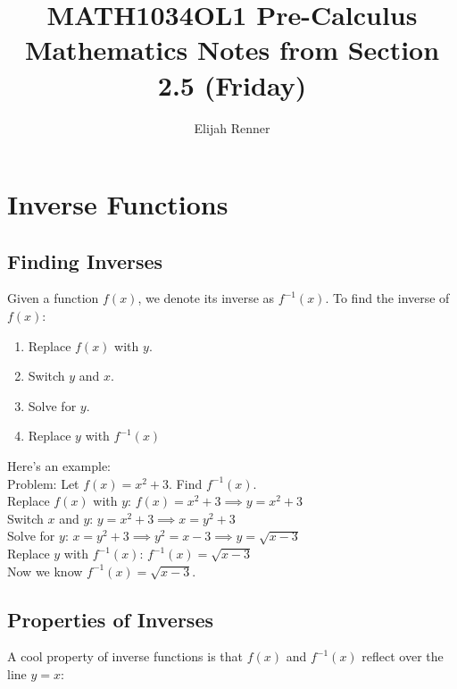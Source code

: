 \documentclass[12pt]{article}
\title{MATH1034OL1 Pre-Calculus Mathematics Notes from Section 2.5 (Friday)}
\author{Elijah Renner}
\begin{document}
\maketitle

\vspace{0.5in}

\tableofcontents

\section{Inverse Functions}

\subsection{Finding Inverses}
Given a function \(f(x)\), we denote its inverse as \(f^{-1}(x).\) To find the inverse of \(f(x)\):\\

\begin{enumerate}
  \item Replace \(f(x)\) with \(y\).
  \item Switch \(y\) and \(x\).
  \item Solve for \(y\).
  \item Replace \(y\) with \(f^{-1}(x)\)
\end{enumerate}

Here's an example:\\

Problem: Let \(f(x)=x^2+3\). Find \(f^{-1}(x)\).\\

Replace \(f(x)\) with \(y\): \(f(x)=x^2+3\implies y=x^2+3\)\\

Switch \(x\) and \(y\): \(y=x^2+3\implies x=y^2+3\)\\

Solve for \(y\): \(x=y^2+3\implies y^2=x-3 \implies y=\sqrt{x-3}\)\\

Replace \(y\) with \(f^{-1}(x)\): \(f^{-1}(x)=\sqrt{x-3}\)\\

Now we know \(f^{-1}(x)=\sqrt{x-3}\).\\

\subsection{Properties of Inverses}

A cool property of inverse functions is that \(f(x)\) and \(f^{-1}(x)\) reflect over the line \(y=x\):\\
\end{document}
